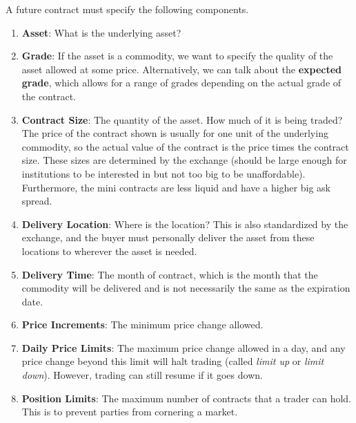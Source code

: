 \documentclass{article}
\begin{document}
  \begin{definition}
    A future contract must specify the following components. 
    \begin{enumerate}
      \item \textbf{Asset}: What is the underlying asset? 

      \item \textbf{Grade}: If the asset is a commodity, we want to specify the quality of the asset allowed at some price. Alternatively, we can talk about the \textbf{expected grade}, which allows for a range of grades depending on the actual grade of the contract.  

      \item \textbf{Contract Size}: The quantity of the asset. How much of it is being traded? The price of the contract shown is usually for one unit of the underlying commodity, so the actual value of the contract is the price times the contract size. These sizes are determined by the exchange (should be large enough for institutions to be interested in but not too big to be unaffordable). Furthermore, the mini contracts are less liquid and have a higher big ask spread. 

      \item \textbf{Delivery Location}: Where is the location? This is also standardized by the exchange, and the buyer must personally deliver the asset from these locations to wherever the asset is needed. 

      \item \textbf{Delivery Time}: The month of contract, which is the month that the commodity will be delivered and is not necessarily the same as the expiration date. 

      \item \textbf{Price Increments}: The minimum price change allowed. 

      \item \textbf{Daily Price Limits}: The maximum price change allowed in a day, and any price change beyond this limit will halt trading (called \textit{limit up} or \textit{limit down}). However, trading can still resume if it goes down. 

      \item \textbf{Position Limits}: The maximum number of contracts that a trader can hold. This is to prevent parties from cornering a market. 
    \end{enumerate}
  \end{definition}
\end{document}
